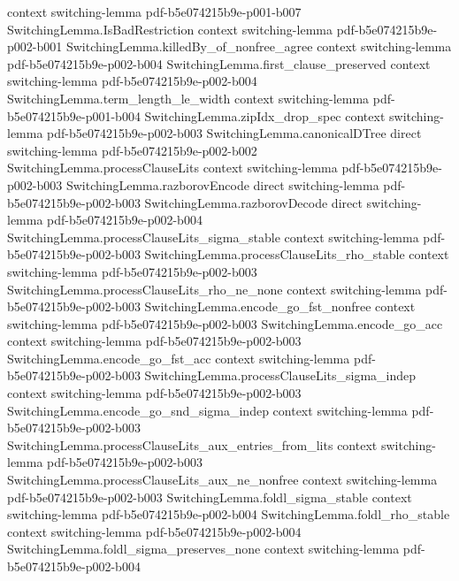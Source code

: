 \begin{lemma}
  {context}
  {switching-lemma}
  {pdf-b5e074215b9e-p001-b007}
\proofstep
  {SwitchingLemma.IsBadRestriction}
  {context}
  {switching-lemma}
  {pdf-b5e074215b9e-p002-b001}
\proofstep
  {SwitchingLemma.killedBy_of_nonfree_agree}
  {context}
  {switching-lemma}
  {pdf-b5e074215b9e-p002-b004}
\proofstep
  {SwitchingLemma.first_clause_preserved}
  {context}
  {switching-lemma}
  {pdf-b5e074215b9e-p002-b004}
\proofstep
  {SwitchingLemma.term_length_le_width}
  {context}
  {switching-lemma}
  {pdf-b5e074215b9e-p001-b004}
\proofstep
  {SwitchingLemma.zipIdx_drop_spec}
  {context}
  {switching-lemma}
  {pdf-b5e074215b9e-p002-b003}
\proofstep
  {SwitchingLemma.canonicalDTree}
  {direct}
  {switching-lemma}
  {pdf-b5e074215b9e-p002-b002}
\proofstep
  {SwitchingLemma.processClauseLits}
  {context}
  {switching-lemma}
  {pdf-b5e074215b9e-p002-b003}
\proofstep
  {SwitchingLemma.razborovEncode}
  {direct}
  {switching-lemma}
  {pdf-b5e074215b9e-p002-b003}
\proofstep
  {SwitchingLemma.razborovDecode}
  {direct}
  {switching-lemma}
  {pdf-b5e074215b9e-p002-b004}
\proofstep
  {SwitchingLemma.processClauseLits_sigma_stable}
  {context}
  {switching-lemma}
  {pdf-b5e074215b9e-p002-b003}
\proofstep
  {SwitchingLemma.processClauseLits_rho_stable}
  {context}
  {switching-lemma}
  {pdf-b5e074215b9e-p002-b003}
\proofstep
  {SwitchingLemma.processClauseLits_rho_ne_none}
  {context}
  {switching-lemma}
  {pdf-b5e074215b9e-p002-b003}
\proofstep
  {SwitchingLemma.encode_go_fst_nonfree}
  {context}
  {switching-lemma}
  {pdf-b5e074215b9e-p002-b003}
\proofstep
  {SwitchingLemma.encode_go_acc}
  {context}
  {switching-lemma}
  {pdf-b5e074215b9e-p002-b003}
\proofstep
  {SwitchingLemma.encode_go_fst_acc}
  {context}
  {switching-lemma}
  {pdf-b5e074215b9e-p002-b003}
\proofstep
  {SwitchingLemma.processClauseLits_sigma_indep}
  {context}
  {switching-lemma}
  {pdf-b5e074215b9e-p002-b003}
\proofstep
  {SwitchingLemma.encode_go_snd_sigma_indep}
  {context}
  {switching-lemma}
  {pdf-b5e074215b9e-p002-b003}
\proofstep
  {SwitchingLemma.processClauseLits_aux_entries_from_lits}
  {context}
  {switching-lemma}
  {pdf-b5e074215b9e-p002-b003}
\proofstep
  {SwitchingLemma.processClauseLits_aux_ne_nonfree}
  {context}
  {switching-lemma}
  {pdf-b5e074215b9e-p002-b003}
\proofstep
  {SwitchingLemma.foldl_sigma_stable}
  {context}
  {switching-lemma}
  {pdf-b5e074215b9e-p002-b004}
\proofstep
  {SwitchingLemma.foldl_rho_stable}
  {context}
  {switching-lemma}
  {pdf-b5e074215b9e-p002-b004}
\proofstep
  {SwitchingLemma.foldl_sigma_preserves_none}
  {context}
  {switching-lemma}
  {pdf-b5e074215b9e-p002-b004}

\end{lemma}
